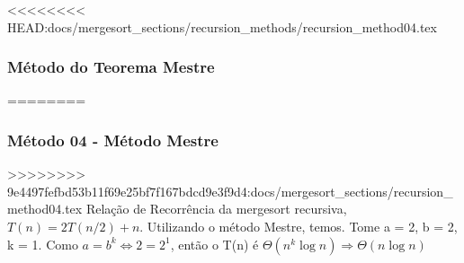 <<<<<<<< HEAD:docs/mergesort_sections/recursion_methods/recursion_method04.tex
\subsubsection{Método do Teorema Mestre}
========
\subsubsection{Método 04 - Método Mestre}
>>>>>>>> 9e4497fefbd53b11f69e25bf7f167bdcd9e3f9d4:docs/mergesort_sections/recursion_method04.tex
Relação de Recorrência da mergesort recursiva, $T(n) = 2T(n/2) + n$. Utilizando o método Mestre, temos.
Tome a = 2, b = 2, k = 1. Como $a = b^k \Leftrightarrow 2 = 2^1$, então o T(n) é $\Theta(n^k \log{n}) \Rightarrow \Theta(n \log{n})$
